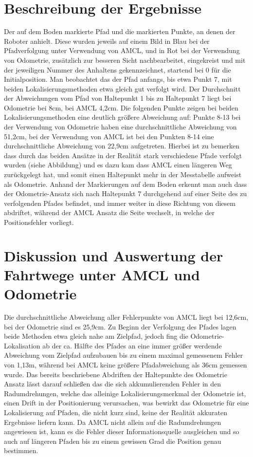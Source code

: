 \documentclass[11pt,a4paper]{article}
\begin{document}
\section{Beschreibung der Ergebnisse}
Der auf dem Boden markierte Pfad und die markierten Punkte, an denen der Roboter anhielt. Diese wurden jeweils auf einem Bild in Blau bei der Pfadverfolgung 
unter Verwendung von AMCL, und in Rot bei der Verwendung von Odometrie, zusätzlich zur besseren Sicht nachbearbeitet, eingekreist und mit der jeweiligen Nummer 
des Anhaltens gekennzeichnet, startend bei 0 für die Initialposition.
Man beobachtet das der Pfad anfangs, bis etwa Punkt 7, mit beiden Lokalisierungsmethoden etwa gleich gut verfolgt wird. Der Durchschnitt der Abweichungen vom Pfad 
von Haltepunkt 1 bis zu Haltepunkt 7 liegt bei Odometrie bei 8cm, bei AMCL 4,2cm. Die folgenden Punkte zeigen bei beiden Lokalisierungsmethoden eine deutlich 
größere Abweichung auf: Punkte 8-13 bei der Verwendung von Odometrie haben eine durchschnittliche Abweichung von 51,2cm, bei der Verwendung von AMCL ist bei den 
Punkten 8-14 eine durchschnittliche Abweichung von 22,9cm aufgetreten. Hierbei ist zu bemerken dass durch das beiden Ansätze in der Realität stark 
verschiedene Pfade verfolgt wurden (siehe Abbildung) und es dazu kam dass AMCL einen längeren Weg zurückgelegt hat, und somit einen Haltepunkt mehr in der Messtabelle 
aufweist als Odometrie.  Anhand der Markierungen auf dem Boden erkennt man auch dass der Odometrie-Ansatz sich nach Haltepunkt 7 durchgehend auf einer Seite des 
zu verfolgenden Pfades befindet, und immer weiter in diese Richtung von diesem abdriftet, während der AMCL Ansatz die Seite wechselt, in welche der Positionsfehler vorliegt.

\section{Diskussion und Auswertung der Fahrtwege unter AMCL und Odometrie}
Die durchschnittliche Abweichung aller Fehlerpunkte von AMCL liegt bei 12,6cm, bei der Odometrie sind es 25,9cm. Zu Beginn der Verfolgung des Pfades lagen beide Methoden 
etwa gleich nahe am Zielpfad, jedoch fing die Odometrie-Lokalisation  ab der ca. Hälfte des Pfades an eine immer größer werdende Abweichung vom Zielpfad aufzubauen bis 
zu einem maximal gemessenem Fehler von 1,13m, während bei AMCL keine größere Pfadabweichung als 36cm gemessen wurde. Das bereits beschriebene Abdriften der 
Haltepunkte des Odometrie Ansatz lässt darauf schließen das die sich akkumulierenden Fehler in den Radumdrehungen, welche das alleinige Lokalisierungsmerkmal 
der Odometrie ist, einen Drift in der Positionierung verursachen, was bewirkt das Odometrie für eine Lokalisierung auf Pfaden, die nicht kurz sind, keine der Realität 
akkuraten Ergebnisse liefern kann. Da AMCL nicht allein auf die Radumdrehungen angewiesen ist, kann es die Fehler dieser Informationsquelle ausgleichen und so auch auf 
längeren Pfaden bis zu einem gewissen Grad die Position genau bestimmen.
\end{document}
